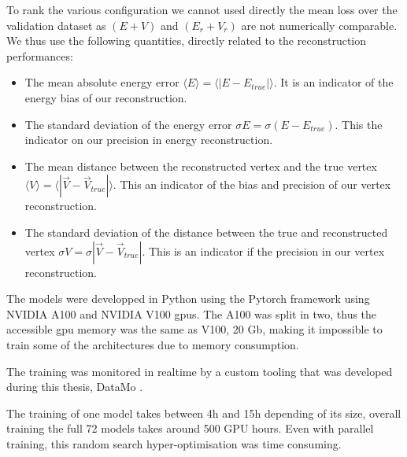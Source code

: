 \documentclass[../main.tex]{subfiles}
\begin{document}
To rank the various configuration we cannot used directly the mean loss over the validation dataset as $(E+V)$ and $(E_r + V_r)$ are not numerically comparable. We thus use the following quantities, directly related to the reconstruction performances:
\begin{itemize}
  \item The mean absolute energy error $\langle E \rangle = \langle | E - E_{true} | \rangle$. It is an indicator of the energy bias of our reconstruction.
  \item The standard deviation of the energy error $\sigma E = \sigma (E - E_{true})$. This the indicator on our precision in energy reconstruction.
  \item The mean distance between the reconstructed vertex and the true vertex $\langle V \rangle = \langle | \vec{V} - \vec{V}_{true} | \rangle$. This an indicator of the bias and precision of our vertex reconstruction.
  \item The standard deviation of the distance between the true and reconstructed vertex $\sigma V = \sigma |\vec{V} - \vec{V}_{true}|$. This is an indicator if the precision in our vertex reconstruction.
\end{itemize}

\hfill

The models were developped in Python using the Pytorch framework \cite{ansel_pytorch_2024} using  NVIDIA A100 \cite{noauthor_nvidia_nodate-1} and NVIDIA V100 \cite{noauthor_nvidia_nodate-2} gpus. The A100 was split in two, thus the accessible gpu memory was the same as V100, 20 Gb, making it impossible to train some of the architectures due to memory consumption.

The training was monitored in realtime by a custom tooling that was developed during this thesis, DataMo \cite{imbert_leonard-imbertdatamo_2024}.

The training of one model takes between 4h and 15h depending of its size, overall training the full 72 models takes around 500 GPU hours. Even with parallel training, this random search hyper-optimisation was time consuming.


\end{document}
